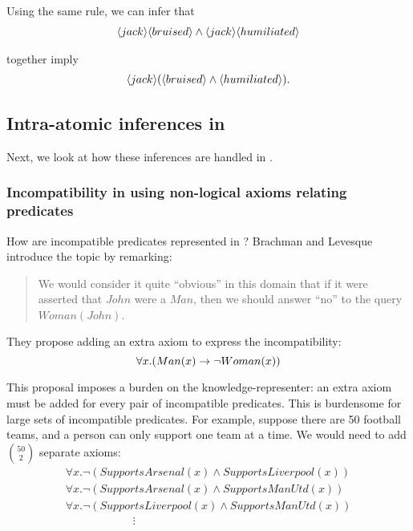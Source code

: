 \NI Using the same rule, we can infer that
\begin{eqnarray*}
   \langle jack \rangle \langle bruised \rangle \land \langle jack \rangle \langle humiliated \rangle \end{eqnarray*}

\NI together imply
\begin{eqnarray*}
\langle jack \rangle (\langle bruised \rangle \land \langle humiliated \rangle ).
\end{eqnarray*}
 
\subsection{Intra-atomic inferences in \fol{}}
Next, we look at how these inferences are handled in \fol{}.

\subsubsection{Incompatibility in \fol{} using non-logical axioms relating predicates}\label{incompatiblepredicatesinfol}

\NI How are incompatible predicates represented in \fol{}?  Brachman
and Levesque \cite{brachman} introduce the topic by remarking:
\begin{quote}
   We would consider it quite ``obvious'' in this domain that if it
   were asserted that $John$ were a $Man$, then we should answer
   ``no'' to the query $Woman(John)$.
\end{quote}

\NI They propose adding an extra axiom to express the incompatibility:
\[
   \forall x. ( Man(x) \rightarrow \neg Woman(x) )
\]  
 
\NI This proposal imposes a burden on the knowledge-representer: an
extra axiom must be added for every pair of incompatible predicates.
This is burdensome for large sets of incompatible predicates.  For
example, suppose there are 50 football teams, and a person can only
support one team at a time.  We would need to add ${50 \choose
  2}$ separate axioms:
\[
\begin{array}{l}
  \forall x.  \neg (SupportsArsenal(x) \land SupportsLiverpool(x))  \\
  \forall x.  \neg (SupportsArsenal(x) \land SupportsManUtd(x))  \\
  \forall x.  \neg (SupportsLiverpool(x) \land SupportsManUtd(x))  \\
  \qquad \qquad \qquad \vdots
\end{array}
\]

